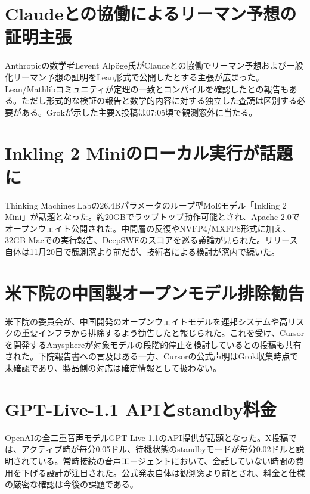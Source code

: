 \section{Claudeとの協働によるリーマン予想の証明主張}
Anthropicの数学者Levent Alpöge氏がClaudeとの協働でリーマン予想および一般化リーマン予想の証明をLean形式で公開したとする主張が広まった。Lean/Mathlibコミュニティが定理の一致とコンパイルを確認したとの報告もある。ただし形式的な検証の報告と数学的内容に対する独立した査読は区別する必要がある。Grokが示した主要X投稿は07:05頃で観測窓外に当たる。

\section{Inkling 2 Miniのローカル実行が話題に}
Thinking Machines Labの26.4Bパラメータのループ型MoEモデル「Inkling 2 Mini」が話題となった。約20GBでラップトップ動作可能とされ、Apache 2.0でオープンウェイト公開された。中間層の反復やNVFP4/MXFP8形式に加え、32GB Macでの実行報告、DeepSWEのスコアを巡る議論が見られた。リリース自体は11月20日で観測窓より前だが、技術者による検討が窓内で続いた。

\section{米下院の中国製オープンモデル排除勧告}
米下院の委員会が、中国開発のオープンウェイトモデルを連邦システムや高リスクの重要インフラから排除するよう勧告したと報じられた。これを受け、Cursorを開発するAnysphereが対象モデルの段階的停止を検討しているとの投稿も共有された。下院報告書への言及はある一方、Cursorの公式声明はGrok収集時点で未確認であり、製品側の対応は確定情報として扱わない。

\section{GPT-Live-1.1 APIとstandby料金}
OpenAIの全二重音声モデルGPT-Live-1.1のAPI提供が話題となった。X投稿では、アクティブ時が毎分0.05ドル、待機状態のstandbyモードが毎分0.02ドルと説明されている。常時接続の音声エージェントにおいて、会話していない時間の費用を下げる設計が注目された。公式発表自体は観測窓より前とされ、料金と仕様の厳密な確認は今後の課題である。

